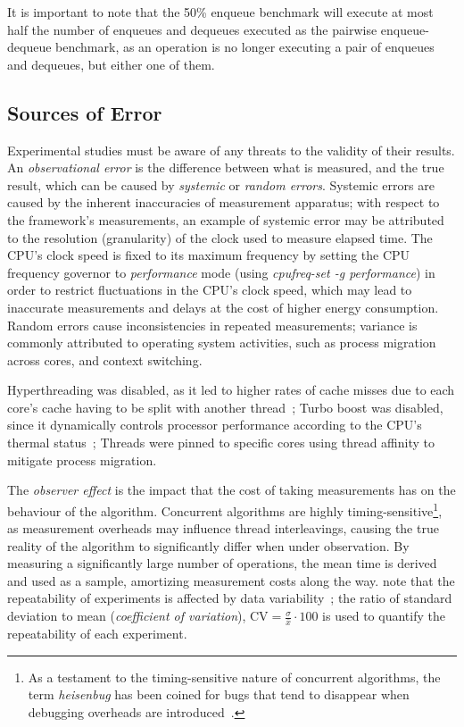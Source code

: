 It is important to note that the 50\% enqueue benchmark will execute at most
half the number of enqueues and dequeues executed as the pairwise
enqueue-dequeue benchmark, as an operation is no longer executing a pair of
enqueues and dequeues, but either one of them.

\subsection{Sources of Error}
Experimental studies must be aware of any threats to the validity of
their results. An \emph{observational error} is the difference between what is
measured, and the true result, which can be caused by \emph{systemic} or
\emph{random errors}. Systemic errors are caused by the inherent inaccuracies
of measurement apparatus; with respect to the framework's
measurements, an example of systemic error may be attributed to the resolution
(granularity) of the clock used to measure elapsed time. The CPU's clock speed is
fixed to its maximum frequency by setting the CPU frequency governor to
\emph{performance} mode (using \emph{cpufreq-set -g performance}) in order to
restrict fluctuations in the CPU's clock speed, which may lead to inaccurate
measurements and delays at the cost of higher energy consumption. Random errors cause inconsistencies in repeated
measurements; variance is
commonly attributed to operating system activities, such as process migration
across cores, and context switching.

Hyperthreading was disabled, as it led to higher rates of cache misses due to each core's cache
having to be split with another thread~\citep{fog2020optimizing}; Turbo boost was
disabled, since it dynamically controls
processor performance according to the CPU's
thermal status~\citep[Section~14.3.3]{intel2021system}; Threads were pinned to
specific cores using thread affinity to mitigate process migration.

The \emph{observer effect} is the impact that the cost of taking measurements
has on the behaviour of the algorithm. Concurrent algorithms are highly
timing-sensitive\footnote{As a testament to the timing-sensitive nature of
concurrent algorithms, the term \emph{heisenbug} has been coined for bugs that
tend to disappear when debugging overheads are
introduced~\cite{perfbook2021}.}, as measurement overheads may influence thread
interleavings, causing the true reality of the algorithm to significantly
differ when under observation. By measuring a significantly large number of
operations, the mean time is derived and used as a sample, amortizing
measurement costs along the way. \citeauthor{aceto2021benchmarking} note that the repeatability of experiments
is affected by data variability~\citep{aceto2021benchmarking}; the ratio of
standard deviation to mean (\emph{coefficient of variation}), $\text{CV} =
\frac{\sigma}{\bar{x}} \cdot 100$ is used to quantify the repeatability of
each experiment.

